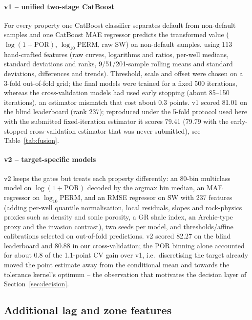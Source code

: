 \documentclass[preprint,12pt]{elsarticle}
\begin{document}
\paragraph{v1 -- unified two-stage CatBoost} For every property one CatBoost \cite{prokhorenkova2018catboost} classifier separates default from non-default samples and one CatBoost MAE regressor predicts the transformed value ($\log(1+\mathrm{POR})$, $\log_{10}\mathrm{PERM}$, raw SW) on non-default samples, using 113 hand-crafted features (raw curves, logarithms and ratios, per-well medians, standard deviations and ranks, 9/51/201-sample rolling means and standard deviations, differences and trends). Threshold, scale and offset were chosen on a 3-fold out-of-fold grid; the final models were trained for a fixed 500 iterations, whereas the cross-validation models had used early stopping (about 85--150 iterations), an estimator mismatch that cost about 0.3 points. v1 scored 81.01 on the blind leaderboard (rank 237); reproduced under the 5-fold protocol used here with the submitted fixed-iteration estimator it scores 79.41 (79.79 with the early-stopped cross-validation estimator that was never submitted), see Table~\ref{tab:fusion}.

\paragraph{v2 -- target-specific models} v2 keeps the gates but treats each property differently: an 80-bin multiclass model on $\log(1+\mathrm{POR})$ decoded by the argmax bin median, an MAE regressor on $\log_{10}\mathrm{PERM}$, and an RMSE regressor on SW with 237 features (adding per-well quantile normalisation, local residuals, slopes and rock-physics proxies such as density and sonic porosity, a GR shale index, an Archie-type proxy and the invasion contrast), two seeds per model, and thresholds/affine calibrations selected on out-of-fold predictions. v2 scored 82.27 on the blind leaderboard and 80.88 in our cross-validation; the POR binning alone accounted for about 0.8 of the 1.1-point CV gain over v1, i.e.\ discretising the target already moved the point estimate away from the conditional mean and towards the tolerance kernel's optimum -- the observation that motivates the decision layer of Section~\ref{sec:decision}.

\subsection{Additional lag and zone features}
\label{sec:features}
\end{document}
